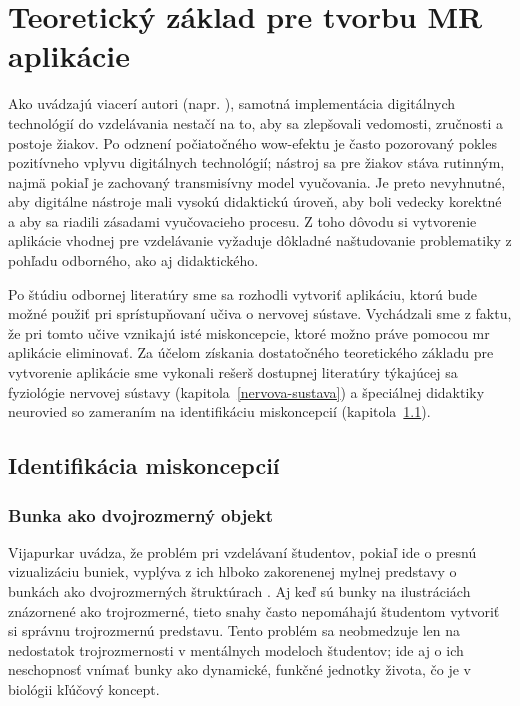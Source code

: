 \section{Teoretický základ pre tvorbu MR aplikácie}
Ako uvádzajú viacerí autori (napr. \cite{turekDidaktika2014,brestenskaKreativneDigitalneKompetencie2020}), samotná implementácia digitálnych technológií do vzdelávania nestačí na to, aby sa zlepšovali
vedomosti, zručnosti a postoje žiakov. Po odznení počiatočného wow-efektu je často pozorovaný pokles pozitívneho vplyvu digitálnych technológií; nástroj sa pre žiakov stáva rutinným, najmä pokiaľ
je zachovaný transmisívny model vyučovania. Je preto nevyhnutné, aby digitálne nástroje mali vysokú didaktickú úroveň, aby boli vedecky korektné a aby sa riadili zásadami vyučovacieho procesu.
Z toho dôvodu si vytvorenie aplikácie vhodnej pre vzdelávanie vyžaduje dôkladné naštudovanie problematiky z pohľadu odborného, ako aj didaktického. 

Po štúdiu odbornej literatúry \cite{nagyovaMiskoncepcieZiakovOblasti2016} sme sa rozhodli vytvoriť aplikáciu, ktorú bude možné použiť pri sprístupňovaní učiva o nervovej sústave. Vychádzali sme z faktu,
že pri tomto učive vznikajú isté miskoncepcie, ktoré možno práve pomocou \acrshort{mr} aplikácie eliminovať. Za účelom získania dostatočného teoretického základu pre vytvorenie aplikácie sme vykonali 
rešerš dostupnej literatúry týkajúcej sa fyziológie nervovej sústavy (kapitola~\ref{nervova-sustava}) a špeciálnej didaktiky neurovied so zameraním na identifikáciu miskoncepcií (kapitola~\ref{miskoncepcie}).

\subsection{Identifikácia miskoncepcií}\label{miskoncepcie}
\subsubsection{Bunka ako dvojrozmerný objekt}
Vijapurkar uvádza, že problém pri vzdelávaní študentov, pokiaľ ide o presnú vizualizáciu buniek, vyplýva z ich hlboko zakorenenej mylnej predstavy o bunkách ako dvojrozmerných 
štruktúrach \cite{vijapurkarWhatCellsReally2014}. Aj keď sú bunky na ilustráciách znázornené ako trojrozmerné, tieto snahy často nepomáhajú študentom vytvoriť si správnu trojrozmernú 
predstavu. Tento problém sa neobmedzuje len na nedostatok trojrozmernosti v mentálnych modeloch študentov; ide aj o ich neschopnosť vnímať bunky ako dynamické, funkčné jednotky života, 
čo je v biológii kľúčový koncept.


